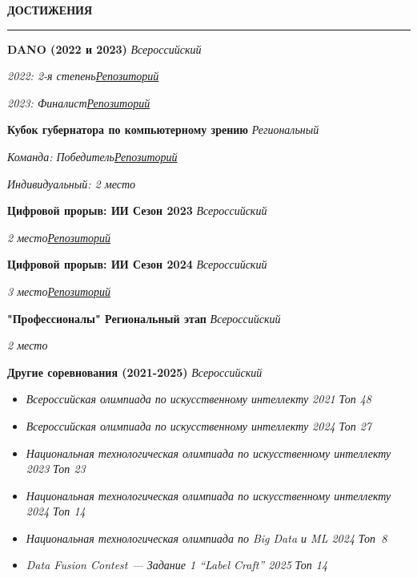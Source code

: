 \documentclass[10pt,a4paper]{article}
\newcommand{\sechead}[1]{%
  \noindent\textbf{#1}\par
  \vspace{-8pt}
  \noindent\rule{\linewidth}{0.4pt}\par\vspace{0.1cm}
}
\begin{document}
\sechead{ДОСТИЖЕНИЯ}

\textbf{DANO (2022 и 2023)} \hfill \emph{Всероссийский}

\textit{2022: 2-я степень}\hfill \emph{\href{https://github.com/D1ffic00lt/dano-olympiad-final-stage}{Репозиторий}}\vspace{0cm}

\textit{2023: Финалист}\hfill \emph{\href{https://github.com/D1ffic00lt/dano-2023}{Репозиторий}}\vspace{0.1cm}

\textbf{Кубок губернатора по компьютерному зрению} \hfill \emph{Региональный}

\textit{Команда: Победитель}\hfill \emph{\href{https://github.com/D1ffic00lt/computer-vision-cup}{Репозиторий}}\vspace{0cm}

\textit{Индивидуальный: 2 место}\vspace{0.1cm}


\textbf{Цифровой прорыв: ИИ Сезон 2023} \hfill \emph{Всероссийский}

\textit{2 место}\hfill \emph{\href{https://github.com/llitone/rutube-video-captioning}{Репозиторий}}\vspace{0.1cm}


\textbf{Цифровой прорыв: ИИ Сезон 2024} \hfill \emph{Всероссийский}

\textit{3 место}\hfill \emph{\href{https://github.com/D1ffic00lt/Sky-Eye}{Репозиторий}}\vspace{0.1cm}

\textbf{"Профессионалы" Региональный этап} \hfill \emph{Всероссийский}

\textit{2 место}\vspace{0.1cm}

\textbf{Другие соревнования (2021-2025)} \hfill \emph{Всероссийский}

\begin{itemize}[
    label=$\cdot$, 
    itemsep=0.1em,
    topsep=0pt,
    parsep=0pt
]
    \item \textit{Всероссийская олимпиада по искусственному интеллекту 2021} \hfill \emph{Топ 48}
    \item \textit{Всероссийская олимпиада по искусственному интеллекту 2024} \hfill \emph{Топ 27}
    \item \textit{Национальная технологическая олимпиада по искусственному интеллекту 2023} \hfill \emph{Топ 23}
    \item \textit{Национальная технологическая олимпиада по искусственному интеллекту 2024} \hfill \emph{Топ 14}
    \item \textit{Национальная технологическая олимпиада по Big Data и ML 2024} \hfill \mbox{\emph{Топ 8}\hspace{1ex}} 
    \item \textit{Data Fusion Contest — Задание 1 “Label Craft” 2025} \hfill \emph{Топ 14}
\end{itemize}\vspace{0.3cm}
\end{document}

